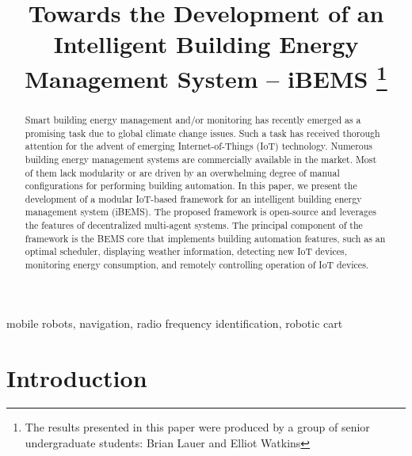 \documentclass[conference]{IEEEtran}
\begin{document}
\title{ Towards the Development of an Intelligent Building Energy Management System -- iBEMS
  \thanks{The results presented in this paper were produced by a group of senior
    undergraduate students: Brian Lauer and Elliot Watkins }
}

\author{
}

\maketitle

\begin{abstract}

  Smart building energy management and/or monitoring has recently emerged as a
  promising task due to global climate change issues. Such a task has received
  thorough attention for the advent of emerging Internet-of-Things (IoT)
  technology. Numerous building energy management systems are commercially
  available in the market. Most of them lack modularity or are driven by an
  overwhelming degree of manual configurations for performing building
  automation. In this paper, we present the development of a modular IoT-based framework for an intelligent building energy management system (iBEMS). The proposed framework is open-source and leverages the features of decentralized multi-agent systems. The principal component of the framework is the BEMS core that implements building automation features, such as an optimal scheduler, displaying weather information, detecting new IoT devices, monitoring energy consumption, and remotely controlling operation of IoT devices.
  
\end{abstract}

\begin{IEEEkeywords}
  mobile robots, navigation, radio frequency identification, robotic cart 
\end{IEEEkeywords}

\section{Introduction}
\label{sec:introduction}
\end{document}
